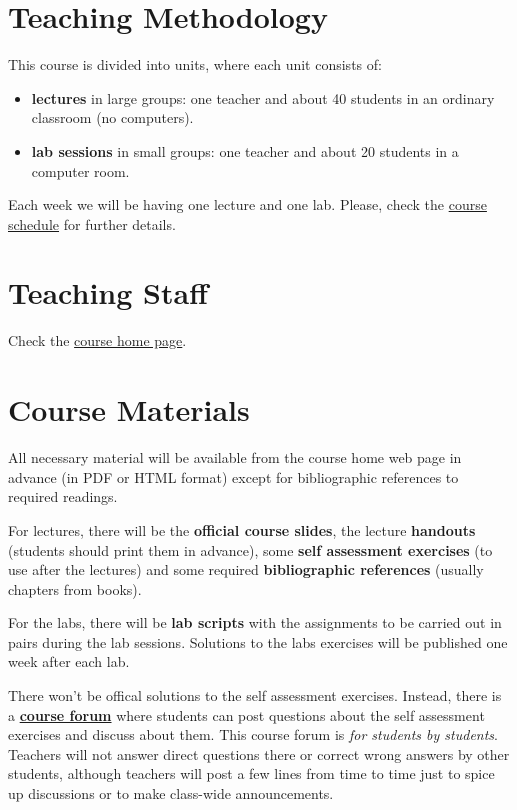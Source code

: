 \documentclass[11pt, a4paper, twoside]{article}
\begin{document}
\section{Teaching Methodology}

This course is divided into units, where each unit consists of:

\begin{itemize}

  \item \textbf{lectures} in large groups: one teacher and about 40 students in
    an ordinary classroom (no computers).

  \item \textbf{lab sessions} in small groups: one teacher and about 20
    students in a computer room.

\end{itemize}

Each week we will be having one lecture and one lab. Please, check the
\href{http://www.it.uc3m.es/alcortes/asig/1415/ps-ging/schedule.pdf}{course
schedule} for further details.

\section{Teaching Staff}

Check the
\href{http://it.uc3m.es/alcortes/asig/1415/ps-ging/index.html}{course home
page}.

\section{Course Materials}

All necessary material will be available from the course home web page in
advance (in PDF or HTML format) except for bibliographic references to required
readings.

For lectures, there will be the \textbf{official course slides}, the lecture
\textbf{handouts} (students should print them in advance), some
\textbf{self assessment exercises} (to use after the lectures) and some
required \textbf{bibliographic references} (usually chapters from books).

For the labs, there will be \textbf{lab scripts} with the assignments to be
carried out in pairs during the lab sessions. Solutions to the labs exercises
will be published one week after each lab.

There won't be offical solutions to the self assessment exercises. Instead,
there is a \textbf{\href{http://it.uc3m.es}{course forum}} where students can
post questions about the self assessment exercises and discuss about them. This
course forum is \emph{for students by students}. Teachers will not answer
direct questions there or correct wrong answers by other students, although
teachers will post a few lines from time to time just to spice up discussions
or to make class-wide announcements.
\end{document}
